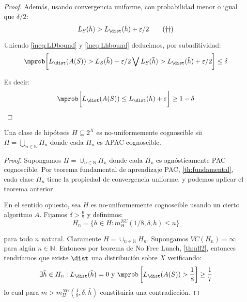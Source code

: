 \begin{proof}
   Además, usando convergencia uniforme, con probabilidad menor o igual que $\delta/2$:
   \begin{equation}
     L_S(\bar{h}) > L_{\dist}(\bar{h}) + \varepsilon/2
     \label{ineq:Lhbound}\tag{\textrm{$\dagger$$\dagger$}}
   \end{equation}

   Uniendo \eqref{ineq:LDbound} y \eqref{ineq:Lhbound} deducimos, por subaditividad:
   \[
     \mprob \bigg[L_{\dist}(A(S)) > L_{S}(\bar{h}) + \varepsilon/2 \bigvee L_S(\bar{h}) > L_{\dist}(\bar{h}) + \varepsilon/2\bigg] \le \delta
   \]
   
   Es decir:
   \[
     \mprob \bigg[L_{\dist}(A(S)) \le L_{\dist}(\bar{h}) + \varepsilon \bigg] \ge 1 - \delta
   \]
  \end{proof}

\begin{theorem}
Una clase de hipótesis $H \subseteq 2^X$ es no-uniformemente cognoscible sii $H = \bigcup_{n\in\mathbb{N}} H_n$ donde
cada $H_n$ es APAC cognoscible.
\end{theorem}
  \begin{proof}
   Supongamos $H = \cup_{n\in \mathbb{N}} H_n$ donde cada $H_n$ es agnósticamente PAC 
   cognoscible. Por teorema fundamental de aprendizaje PAC, \ref{th:fundamental}, cada clase $H_n$ tiene la propiedad de 
   convergencia uniforme, y podemos aplicar el teorema anterior.

   En el sentido opuesto, sea $H$ es no-uniformemente cognoscible usando un cierto algoritmo $A$. Fijamos $\delta > \frac{6}{7}$ y
   definimos:
   \[
     H_n = \{h \in H : m_{H}^{NU}(1/8, \delta, h) \le n\}
   \]
   
   para todo $n$ natural. Claramente $H = \cup_{n\in \mathbb{N}} H_n$. Supongamos $VC(H_n) = \infty$ para algún $n\in \mathbb{N}$.
   Entonces por teorema de No Free Lunch, \ref{th:nfl2}, entonces tendríamos que existe $\dist$ una distribución sobre 
   $X$ verificando:
   \[
     \exists \bar{h}\in H_n: L_{\dist}(\bar{h}) = 0 \textrm{ y } \mprob \left[ L_{\dist}(A(S)) > \frac{1}{8} \right] \ge \frac{1}{7}
   \]
   lo cual para $m > m_H^{NU}(\frac{1}{8}, \delta, \bar{h})$ constituiría una contradicción.
  \end{proof}
  
